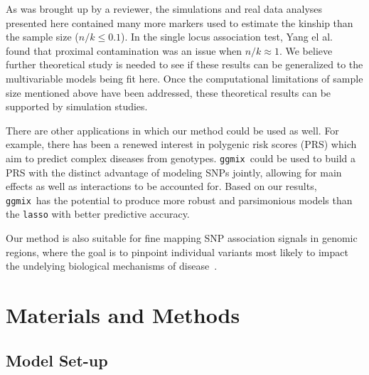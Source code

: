\documentclass[10pt,letterpaper]{article}
\newcommand{\ggmix}{\texttt{ggmix}}
\begin{document}
		As was brought up by a reviewer, the simulations and real data analyses presented here contained many more markers used to estimate the kinship than the sample size ($n/k \leq 0.1$). In the single locus association test, Yang el al.~\cite{yang2014advantages} found that proximal contamination was an issue when $n/k \approx 1$. We believe further theoretical study is needed to see if these results can be generalized to the multivariable models being fit here. Once the computational limitations of sample size mentioned above have been addressed, these theoretical results can be supported by simulation studies.


		There are other applications in which our method could be used as well.
		For example, there has been a renewed interest in polygenic risk scores (PRS) which aim to predict complex diseases from genotypes. 
		\ggmix ~could be used to build a PRS with the distinct advantage of modeling SNPs jointly, allowing for main effects as well as interactions to be accounted for. 
		Based on our results, \ggmix ~has the potential to produce more robust and parsimonious models than the \texttt{lasso} with better predictive accuracy.

		Our method is also suitable for fine mapping SNP association signals in genomic regions, where the goal is to pinpoint individual variants most likely to impact the undelying biological mechanisms of disease~\cite{spain2015strategies}.

		
		
		



\section*{Materials and Methods}\label{sec:methods}


\subsection*{Model Set-up}
\end{document}
